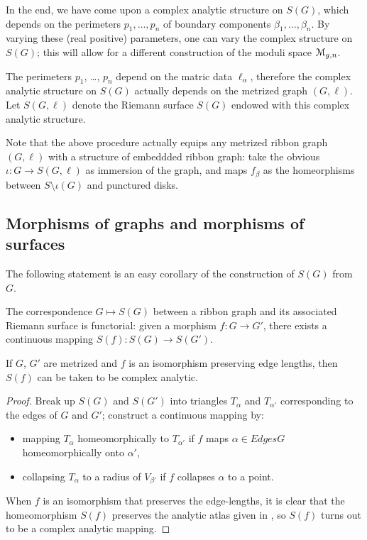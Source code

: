 In the end, we have come upon a complex analytic structure on $S(G)$,
which depends on the perimeters $p_1, \ldots, p_n$ of boundary components
$\beta_1, \ldots, \beta_n$. By varying these (real positive) parameters, one can
vary the complex structure on $S(G)$; this will allow for a different
construction of the moduli space $\mathcal{M}_{g,n}$.

The perimeters $p_1$, \ldots, $p_n$ depend on the matric data $\ell_\alpha$,
therefore the complex analytic structure on $S(G)$ actually depends on
the metrized graph $(G, \ell)$.  Let $S(G, \ell)$ denote the Riemann
surface $S(G)$ endowed with this complex analytic structure.

\begin{remark}
  Note that the above procedure actually equips any metrized ribbon
  graph $(G, \ell)$ with a structure of embeddded ribbon graph: take the
  obvious $\iota:G \to S(G, \ell)$ as immersion of the graph, and maps $f_\beta$ as
  the homeorphisms between $S \setminus \iota(G)$ and punctured disks.
\end{remark}


\subsection{Morphisms of graphs and morphisms of surfaces}
\label{sec:automorphisms}
The following statement is an easy corollary of the construction of
$S(G)$ from $G$.
\begin{lemma}
  \label{lemma:rg-morphism}
  The correspondence $G \mapsto S(G)$ between a ribbon graph and its
  associated Riemann surface is functorial: given a morphism $f: G \to
  G'$, there exists a continuous mapping $S(f): S(G) \to S(G')$.

  If $G$, $G'$ are metrized and $f$ is an isomorphism preserving edge
  lengths, then $S(f)$ can be taken to be complex analytic.
\end{lemma}
\begin{proof}
  Break up $S(G)$ and $S(G')$ into triangles $T_\alpha$ and $T_{\alpha'}$
  corresponding to the edges of $G$ and $G'$; construct a continuous
  mapping by:
  \begin{itemize}
  \item mapping $T_\alpha$ homeomorphically to $T_{\alpha'}$ if $f$ maps $\alpha \in Edges{G}$
    homeomorphically onto $\alpha'$,
  \item collapsing $T_\alpha$ to a radius of $V_{\beta'}$ if $f$ collapses $\alpha$
    to a point.
  \end{itemize}

  When $f$ is an isomorphism that preserves the edge-lengths, it is
  clear that the homeomorphism $S(f)$ preserves the analytic atlas
  given in , so $S(f)$ turns out to be a complex
  analytic mapping.
\end{proof}


